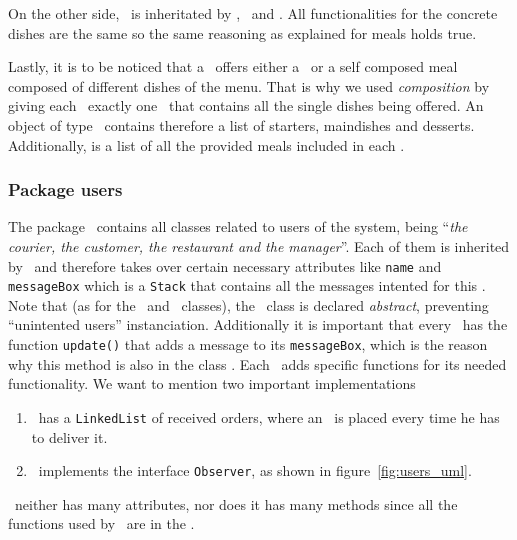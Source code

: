 On the other side, \Dish~is inheritated by \Starter, \MainDish~and \Dessert.
All functionalities for the concrete dishes are the same so the same 
reasoning as explained for meals holds true. 

Lastly, it is to be noticed that a \Restaurant~offers either a \Meal~or
a self composed meal composed of different dishes of the menu.
That is why we used \emph{composition} by giving each \Restaurant~exactly
one \Menu~that contains all the single dishes being offered.
An object of type \Menu~contains therefore a list of starters, maindishes and desserts.
Additionally, is a list of all the provided meals included in each \Restaurant.


\subsubsection{Package users} %
\label{ssub:users}

The package \users~contains all classes related to users of the system,
being ``\textit{the courier, the customer, the restaurant and the manager}''.
Each of them is inherited by \User~and therefore takes over certain 
necessary attributes like \lstinline|name| and \lstinline|messageBox|
which is a \lstinline|Stack| that contains all the messages intented for this \User.
Note that (as for the \Dish~and \Meal~classes), the \User~class is declared \emph{abstract},
preventing ``unintented users'' instanciation.
Additionally it is important that every \User~has the function \lstinline|update()|
that adds a message to its \lstinline|messageBox|, which is the reason 
why this method is also in the class \User.
Each \User~adds specific functions for its needed functionality.
We want to mention two important implementations
\begin{enumerate}
	\item \Courier~has a \lstinline|LinkedList| of received orders,
  where an \Order~is placed every time he has to deliver it.
	\item \Customer~implements the interface \lstinline|Observer|,
  as shown in figure~\ref{fig:users_uml}.
\end{enumerate}

\Manager~neither has many attributes, nor does it has many methods 
since all the functions used by \Manager~are in the \Core.


